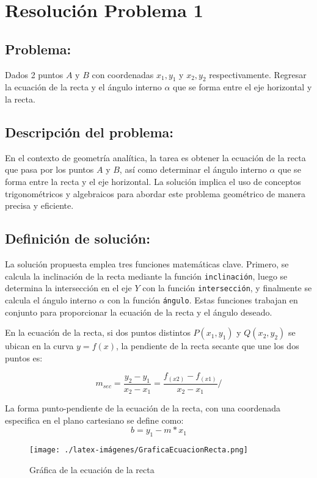 \section{Resolución Problema 1} 
\subsection{Problema:}
Dados 2 puntos $A \mbox{ y } B$ con coordenadas $x_{1}, y_{1}$ y $x_{2}, y_{2}$  respectivamente. Regresar la ecuación de la recta y el ángulo interno $\alpha$ que se forma entre el eje horizontal y la recta. 

\subsection{\textbf{Descripción del problema:}}
En el contexto de geometría analítica, la tarea es obtener la ecuación de la recta que pasa por los puntos $A$ y $B$, así como determinar el ángulo interno $\alpha$ que se forma entre la recta y el eje horizontal. La solución implica el uso de conceptos trigonométricos y algebraicos para abordar este problema geométrico de manera precisa y eficiente.

\subsection{\textbf{Definición de solución:}}
La solución propuesta emplea tres funciones matemáticas clave. Primero, se calcula la inclinación de la recta mediante la función \texttt{inclinación}, luego se determina la intersección en el eje $Y$ con la función \texttt{intersección}, y finalmente se calcula el ángulo interno $\alpha$ con la función \texttt{ángulo}. Estas funciones trabajan en conjunto para proporcionar la ecuación de la recta y el ángulo deseado.

En la ecuación de la recta, si dos puntos distintos $P(x_{1}, y_{1})$ y $Q(x_{2}, y_{2})$ se ubican en la curva $y=f(x)$, la pendiente de la recta secante que une los dos puntos es:

\begin{equation}
    m_{sec}=\frac{y_{2} - y_{1}}{x_{2} - x_{1}} = \frac{f_{(x2)} - f_{(x1)} }{x_{2} - x_{1}}/
    \label{eqn:rectaPendiente}
\end{equation}

La forma punto-pendiente de la ecuación de la recta, con una coordenada especifica en el plano cartesiano se define como:
\begin{equation}
    b = y_{1} - m * x_{1}
     \label{eqn:eqnRecta}
\end{equation}
\begin{figure}[h!]
    \centering
    \texttt{[image: ./latex-imágenes/GraficaEcuacionRecta.png]}
    \caption{Gráfica de la ecuación de la recta}
    \label{fig:GraficaEcuacionRecta}
\end{figure}

